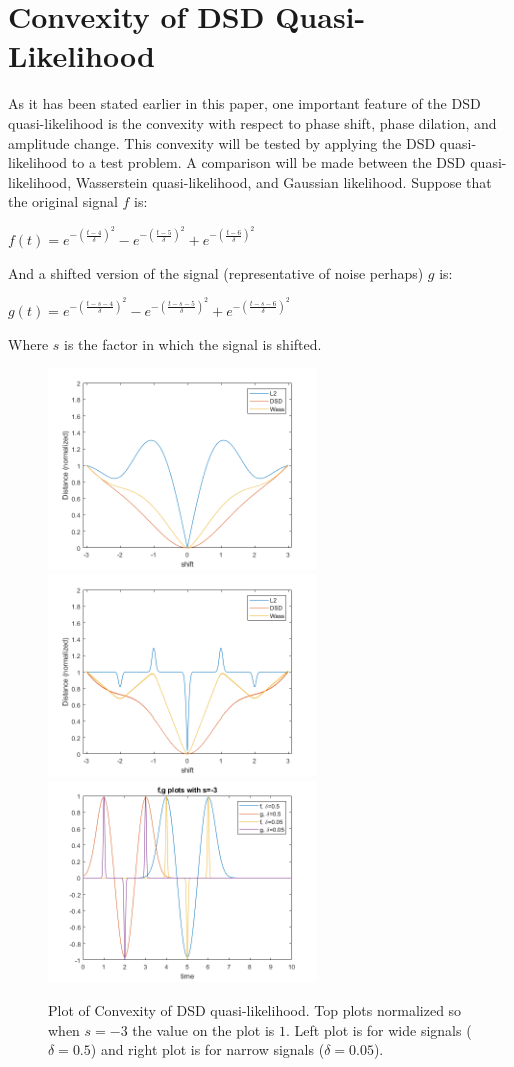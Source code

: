 \documentclass[botnum, fleqn]{unmeethesis}
\begin{document}
\section{\label{section:Convexity of DSD Quasi-Likelihood}Convexity of DSD Quasi-Likelihood}
As it has been stated earlier in this paper, one important feature of the DSD quasi-likelihood is the convexity with respect to phase shift, phase dilation, and amplitude change. This convexity will be tested by applying the DSD quasi-likelihood to a test problem. A comparison will be made between the DSD quasi-likelihood, Wasserstein quasi-likelihood, and Gaussian likelihood. 
Suppose that the original signal $f$ is:
\begin{center}
	$f(t)=e^{-(\frac{t-4}{\delta})^2}-e^{-(\frac{t-5}{\delta})^2}+e^{-(\frac{t-6}{\delta})^2}$
\end{center}
And a shifted version of the signal (representative of noise perhaps) $g$ is:
\begin{center}
	$g(t)=e^{-(\frac{t-s-4}{\delta})^2}-e^{-(\frac{t-s-5}{\delta})^2}+e^{-(\frac{t-s-6}{\delta})^2}$
\end{center}
Where $s$ is the factor in which the signal is shifted.
\begin{figure}[H]
	\centering
	\includegraphics[width=2.8in]{Convex.png}
	\includegraphics[width=2.8in]{Convex1.png}
	\includegraphics[width=2.8in]{fgplot.png}
	\caption{Plot of Convexity of DSD quasi-likelihood. Top plots normalized so when $s=-3$ the value on the plot is $1$. Left plot is for wide signals ($\delta = 0.5$) and right plot is for narrow signals ($\delta=0.05$).}
\end{figure}
\end{document}
